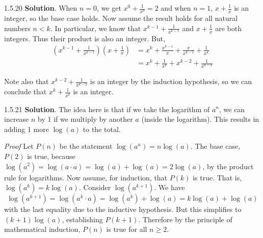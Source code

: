 \documentclass[11pt,]{book}
\makeatletter
\theoremstyle{ptxplainnotitle}
\theoremstyle{ptxplaintitle}
\renewcommand*{\proofname}{Proof}
\renewenvironment{proof}[1][\proofname]{\par
  \pushQED{\qed}%
  \normalfont \topsep6\p@\@plus6\p@\relax
  \trivlist
  \item\relax
    {\itshape
    #1\@addpunct{.}}\hspace\labelsep\ignorespaces
}{%
  \popQED\endtrivlist\@endpefalse
}
\theoremstyle{ptxdefinitionnotitle}
\theoremstyle{ptxdefinitiontitle}
\theoremstyle{ptxdefinitionnotitle}
\theoremstyle{ptxdefinitiontitle}
\theoremstyle{ptxdefinitionnotitle}
\theoremstyle{ptxdefinitiontitle}
\theoremstyle{ptxdefinitiontitlenonumber}
\theoremstyle{ptxdefinitiontitlenonumber}
\numberwithin{equation}{chapter}
\newcommand{\lt}{<}
\newcommand{\amp}{&}
\makeatother
\begin{document}
\begin{divisionexercise}{1.5.20}
\textbf{Solution}.\quad%
\hypertarget{p-639}{}%
When \(n = 0\), we get \(x^0 +\frac{1}{x^0} = 2\) and when \(n = 1\), \(x + \frac{1}{x}\) is an integer, so the base case holds. Now assume the result holds for all natural numbers \(n \lt  k\). In particular, we know that \(x^{k-1} + \frac{1}{x^{k-1}}\) and \(x + \frac{1}{x}\) are both integers. Thus their product is also an integer. But,%
\begin{align*}
\left(x^{k-1} + \frac{1}{x^{k-1}}\right)\left(x + \frac{1}{x}\right) \amp = x^k + \frac{x^{k-1}}{x} + \frac{x}{x^{k-1}} + \frac{1}{x^k}\\
\amp = x^k + \frac{1}{x^k} + x^{k-2} + \frac{1}{x^{k-2}}
\end{align*}
%
\par
\hypertarget{p-640}{}%
Note also that \(x^{k-2} + \frac{1}{x^{k-2}}\) is an integer by the induction hypothesis, so we can conclude that \(x^k + \frac{1}{x^k}\) is an integer.%
\end{divisionexercise}%
\begin{divisionexercise}{1.5.21}
\textbf{Solution}.\quad%
\hypertarget{p-642}{}%
The idea here is that if we take the logarithm of \(a^n\), we can increase \(n\) by 1 if we multiply by another \(a\) (inside the logarithm). This results in adding 1 more \(\log(a)\) to the total.%
\begin{proof}\hypertarget{proof-18}{}
\hypertarget{p-643}{}%
Let \(P(n)\) be the statement \(\log(a^n) = n \log(a)\). The base case, \(P(2)\) is true, because \(\log(a^2) = \log(a\cdot a) = \log(a) + \log(a) = 2\log(a)\), by the product rule for logarithms. Now assume, for induction, that \(P(k)\) is true. That is, \(\log(a^k) = k\log(a)\). Consider \(\log(a^{k+1})\). We have%
\begin{equation*}
\log(a^{k+1}) = \log(a^k\cdot a) = \log(a^k) + \log(a) = k\log(a) + \log(a)
\end{equation*}
with the last equality due to the inductive hypothesis. But this simplifies to \((k+1) \log(a)\), establishing \(P(k+1)\). Therefore by the principle of mathematical induction, \(P(n)\) is true for all \(n \ge 2\).%
\end{proof}
\end{divisionexercise}%
\end{document}
